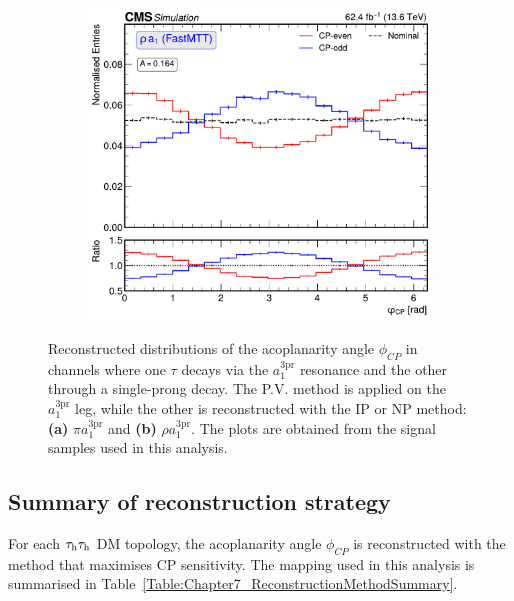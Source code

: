 \begin{figure}[!htbp]
\begin{subfigure}[b]{0.49\textwidth}
            \includegraphics[width=\textwidth]{Figures/Chapter7/Acoplanarity/With_IP/aco_rho_a1_FASTMTT_MassConstraint.pdf}
            \caption{}
        \end{subfigure}
    \caption[Reconstructed $\phi_{CP}$ distributions with the combined IP/NP--PV method.]
    {Reconstructed distributions of the acoplanarity angle $\phi_{CP}$ in channels where one $\tau$ decays via the $a_1^{3\mathrm{pr}}$ resonance and the other through a single-prong decay. The \ac{P.V.} method is applied on the $a_1^{3\mathrm{pr}}$ leg, while the other is reconstructed with the \ac{IP} or \ac{NP} method: \textbf{(a)} $\pi a_1^{3\mathrm{pr}}$ and \textbf{(b)} $\rho a_1^{3\mathrm{pr}}$. The plots are obtained from the signal samples used in this analysis.}
    \label{Figure:CPDist_Combined_IPNP_PV}
\end{figure}

\subsection{Summary of reconstruction strategy}
\label{Section:Chapter7_MethodSummary}

For each $\tau_\mathrm{h}\tau_\mathrm{h}$ DM topology, the acoplanarity angle $\phi_{CP}$ is reconstructed with the method that maximises CP sensitivity. The mapping used in this analysis is summarised in Table~\ref{Table:Chapter7_ReconstructionMethodSummary}.


